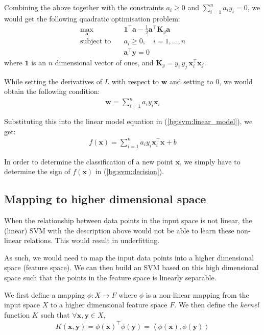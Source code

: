 \documentclass[12pt, twoside, a4paper]{report}
\def\vec{\boldsymbol}
\begin{document}
Combining the above together with the constraints $a_i \geq 0$ and $\sum_{i=1}^n a_i y_i = 0$, we would get the following quadratic optimisation problem:
\begin{align*}
\max_{\vec a} \quad &\vec{1}^\top \vec a - \frac{1}{2} \vec{a}^\top \vec{K}_y \vec{a} \\
\text{subject to} \quad &a_i \geq 0, \quad i = 1, \dots , n \\
&\vec{a}^\top \vec y = 0
\end{align*}
where $\vec{1}$ is an $n$ dimensional vector of ones, and $\vec{K}_y = y_i \, y_j \, \vec{x}_i^\top \vec{x}_j$.

While setting the derivatives of $L$ with respect to $\vec{w}$ and setting to 0, we would obtain the following condition:
\begin{align*}
\vec{w} = \sum_{i=1}^n a_i y_i \vec{x}_i
\end{align*}

Substituting this into the linear model equation in (\ref{bg:svm:linear_model}), we get:
\begin{align}
f(\vec{x}) = \sum_{i=1}^n a_i y_i \vec{x}_i^\top \vec{x} + b \label{bg:svm:decision}
\end{align}

In order to determine the classification of a new  point $\vec{x}$, we simply have to determine the sign of $f(\vec{x})$ in (\ref{bg:svm:decision}).

\subsection{Mapping to higher dimensional space}
When the relationship between data points in the input space is not linear, the (linear) SVM with the description above would not be able to learn these non-linear relations. This would result in underfitting.

As such, we would need to map the input data points into a higher dimensional space (feature space). We can then build an SVM based on this high dimensional space such that the points in the feature space is linearly separable.

We first define a mapping $\phi : X \rightarrow F$ where $\phi$ is a non-linear mapping from the input space $X$ to a higher dimensional feature space $F$. We then define the \textit{kernel} function $K$ such that $\forall \vec x, \vec y \in X$,
\begin{align*}
K(\vec x, \vec y) = \phi(\vec x)^\top \phi(\vec{y}) = \left\langle \phi(\vec x) , \phi(\vec{y}) \right\rangle
\end{align*}
\end{document}
